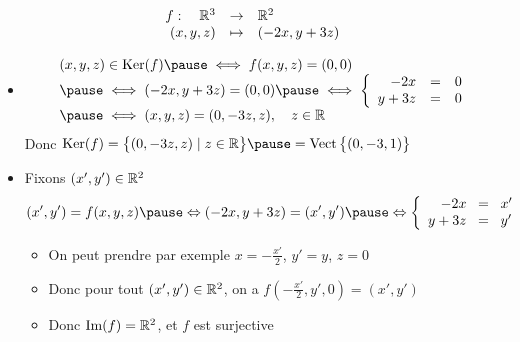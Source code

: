 \begin{frame}
\begin{exemple}
$$\begin{array}{rcl}
f : \quad \mathbb{R}^3 & \to & \mathbb{R}^2\\
(x,y,z) & \mapsto & (-2x,y+3z)
 \end{array}$$
 \pause
\vspace*{-4ex}
\begin{itemize}
  
  \item {}
  \vspace*{-2ex}
 \pause  
$$
\begin{array}{l}
(x,y,z) \in \Ker(f)    \pause \iff f(x,y,z)=(0,0) \\
 \pause
\iff (-2x,y+3z)=(0,0)  \pause \iff \left\{\begin{array}{rcl}
                               -2x  & = & 0 \\
                               y+3z & = & 0 \\
                               \end{array}\right. \\
 \pause  \iff  (x,y,z) = (0,-3z,z), \quad z \in \Rr \\   
\end{array}
$$ 
\pause
Donc $\Ker(f) = \big\{ (0,-3z,z) \mid  z \in \Rr \big\} \pause = \Vect\big\{ (0,-3,1) \big\}$ 

 \pause
  \item {}  \pause \qquad Fixons $(x',y')\in \mathbb{R}^2$
\vspace*{-2ex}  
 \pause
$$
(x',y')= f(x,y,z) \pause
  \Leftrightarrow  (-2x,y+3z)=(x',y') 
 \pause  \Leftrightarrow  \left\{\begin{array}{rcl}
             -2x  & \!=\! & x' \\
             y+3z & \!=\! & y' \\
          \end{array}\right.    
$$
\vspace*{-2ex}
 \pause
  \begin{itemize}
    \item On peut prendre par exemple $x = -\frac{x'}{2}$, $y'=y$, $z=0$
 \pause    
    \item Donc pour tout $(x',y') \in \mathbb{R}^2$, on a $f(-\frac{x'}{2},y',0) = (x',y')$
  \pause   
    \item Donc $\mathop{\text{Im}}\nolimits(f)= \mathbb{R}^2$, et $f$ est surjective
  \end{itemize}
\end{itemize}
\end{exemple}
\end{frame}


